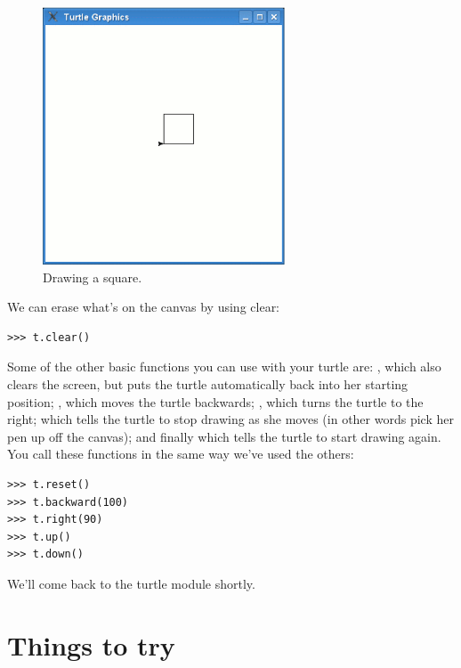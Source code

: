 \begin{figure}
\begin{center}
\includegraphics[width=72mm]{figure16.eps}
\end{center}
\caption{Drawing a square.}\label{fig16}
\end{figure}

We can erase what's on the canvas by using clear:

\begin{listing}
\begin{verbatim}
>>> t.clear()
\end{verbatim}
\end{listing}

Some of the other basic functions you can use with your turtle are: , which also clears the screen, but puts the turtle automatically back into her starting position; , which moves the turtle backwards; , which turns the turtle to the right;  which tells the turtle to stop drawing as she moves (in other words pick her pen up off the canvas); and finally  which tells the turtle to start drawing again. You call these functions in the same way we've used the others:

\begin{listing}
\begin{verbatim}
>>> t.reset()
>>> t.backward(100)
>>> t.right(90)
>>> t.up()
>>> t.down()
\end{verbatim}
\end{listing}

\noindent
We'll come back to the turtle module shortly.

\section{Things to try}

